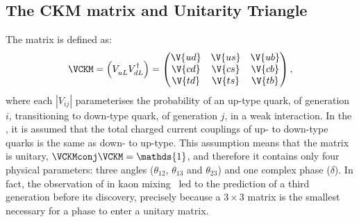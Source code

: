 \subsection{The CKM matrix and Unitarity Triangle}
\label{sec:ckm}

The \ckm matrix is defined as:
\begin{equation}
  \VCKM = \left(V_{uL}^{\phantom{\dagger}} V_{dL}^\dagger\right) =
  \begin{pmatrix}
    \V{ud} & \V{us} & \V{ub} \\
    \V{cd} & \V{cs} & \V{cb} \\
    \V{td} & \V{ts} & \V{tb} \\
  \end{pmatrix},
\end{equation}
where each $|V_{ij}|$ parameterises the probability of an up-type quark, of generation $i$,
transitioning to down-type quark, of generation $j$, in a weak interaction.
In the \sm, it is assumed that the total charged current couplings of up- to down-type quarks is the
same as down- to up-type.
This assumption means that the \ckm matrix is unitary, $\VCKMconj\VCKM = \mathds{1}$, and therefore
it contains only four physical parameters: three angles ($\theta_{12}$, $\theta_{13}$ and
$\theta_{23}$) and one complex phase ($\delta$).
In fact, the observation of \CPV in kaon mixing~\cite{Christenson:1964fg}
led to the prediction of a third generation before
its discovery, precisely because a $3\times3$ matrix is the smallest necessary for a phase to enter
a unitary matrix.




